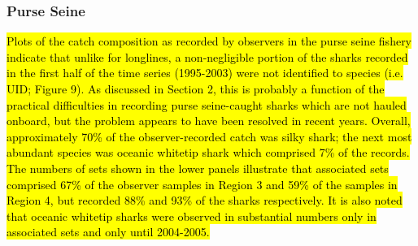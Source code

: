 \documentclass[12pt]{SCreport}
\begin{document}

  
 \subsubsection*{Purse Seine} 
 
\hl{ Plots of the catch composition as recorded by observers in the purse seine fishery indicate that unlike for longlines, a non-negligible portion of the sharks recorded in the first half of the time series (1995-2003) were not identified to species (i.e. UID; Figure 9). As discussed in Section 2, this is probably a function of the practical difficulties in recording purse seine-caught sharks which are not hauled onboard, but the problem appears to have been resolved in recent years. Overall, approximately 70\% of the observer-recorded catch was silky shark; the next most abundant species was oceanic whitetip shark which comprised 7\% of the records. The numbers of sets shown in the lower panels illustrate that associated sets comprised 67\% of the observer samples in Region 3 and 59\% of the samples in Region 4, but recorded 88\% and 93\% of the sharks respectively. It is also noted that oceanic whitetip sharks were observed in substantial numbers only in associated sets and only until 2004-2005.}
 
\end{document}
